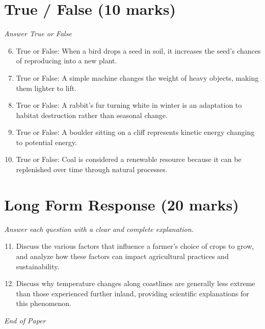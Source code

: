 \documentclass[12pt]{article}
\begin{document}
\section*{True / False (10 marks)}
\textit{Answer True or False}
\begin{enumerate}[label=\arabic*.]
\setcounter{enumi}{5}
\item True or False: When a bird drops a seed in soil, it increases the seed's chances of reproducing into a new plant.
\item True or False: A simple machine changes the weight of heavy objects, making them lighter to lift.
\item True or False: A rabbit's fur turning white in winter is an adaptation to habitat destruction rather than seasonal change.
\item True or False: A boulder sitting on a cliff represents kinetic energy changing to potential energy.
\item True or False: Coal is considered a renewable resource because it can be replenished over time through natural processes.
\end{enumerate}

\section*{Long Form Response (20 marks)}
\textit{Answer each question with a clear and complete explanation.}
\begin{enumerate}[label=\arabic*.]
\setcounter{enumi}{10}
\item Discuss the various factors that influence a farmer's choice of crops to grow, and analyze how these factors can impact agricultural practices and sustainability.
\item Discuss why temperature changes along coastlines are generally less extreme than those experienced further inland, providing scientific explanations for this phenomenon.
\end{enumerate}

\vfill
\noindent\textit{End of Paper}
\end{document}
